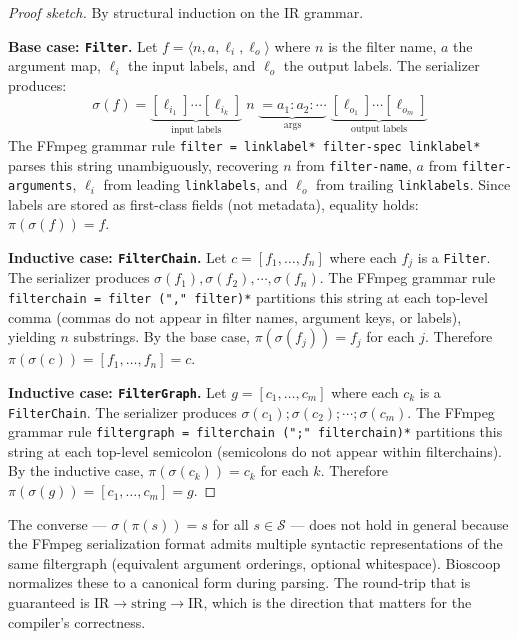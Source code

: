 \documentclass[conference]{IEEEtran}
\begin{document}
\begin{proof}[Proof sketch]
By structural induction on the IR grammar.

\textbf{Base case: \texttt{Filter}.} Let $f = \langle n, a, \ell_i, \ell_o \rangle$ where $n$ is the filter name, $a$ the argument map, $\ell_i$ the input labels, and $\ell_o$ the output labels. The serializer produces:
\[
\sigma(f) = \underbrace{[\ell_{i_1}]\cdots[\ell_{i_k}]}_{\text{input labels}} \; n \; \underbrace{=a_1:a_2:\cdots}_{\text{args}} \; \underbrace{[\ell_{o_1}]\cdots[\ell_{o_m}]}_{\text{output labels}}
\]
The FFmpeg grammar rule \texttt{filter = linklabel* filter-spec linklabel*} parses this string unambiguously, recovering $n$ from \texttt{filter-name}, $a$ from \texttt{filter-arguments}, $\ell_i$ from leading \texttt{linklabels}, and $\ell_o$ from trailing \texttt{linklabels}. Since labels are stored as first-class fields (not metadata), equality holds: $\pi(\sigma(f)) = f$.

\textbf{Inductive case: \texttt{FilterChain}.} Let $c = [f_1, \ldots, f_n]$ where each $f_j$ is a \texttt{Filter}. The serializer produces $\sigma(f_1) \mathbin{,} \sigma(f_2) \mathbin{,} \cdots \mathbin{,} \sigma(f_n)$. The FFmpeg grammar rule \texttt{filterchain = filter ("," filter)*} partitions this string at each top-level comma (commas do not appear in filter names, argument keys, or labels), yielding $n$ substrings. By the base case, $\pi(\sigma(f_j)) = f_j$ for each $j$. Therefore $\pi(\sigma(c)) = [f_1, \ldots, f_n] = c$.

\textbf{Inductive case: \texttt{FilterGraph}.} Let $g = [c_1, \ldots, c_m]$ where each $c_k$ is a \texttt{FilterChain}. The serializer produces $\sigma(c_1) \mathbin{;} \sigma(c_2) \mathbin{;} \cdots \mathbin{;} \sigma(c_m)$. The FFmpeg grammar rule \texttt{filtergraph = filterchain (";" filterchain)*} partitions this string at each top-level semicolon (semicolons do not appear within filterchains). By the inductive case, $\pi(\sigma(c_k)) = c_k$ for each $k$. Therefore $\pi(\sigma(g)) = [c_1, \ldots, c_m] = g$.
\end{proof}

The converse --- $\sigma(\pi(s)) = s$ for all $s \in \mathcal{S}$ --- does not hold in general because the FFmpeg serialization format admits multiple syntactic representations of the same filtergraph (equivalent argument orderings, optional whitespace). Bioscoop normalizes these to a canonical form during parsing. The round-trip that is guaranteed is $\text{IR} \rightarrow \text{string} \rightarrow \text{IR}$, which is the direction that matters for the compiler's correctness.
\end{document}
